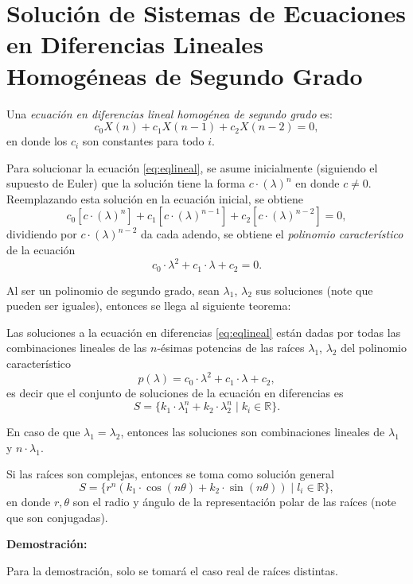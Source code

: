 \chapter{Solución de Sistemas de Ecuaciones en Diferencias Lineales Homogéneas de Segundo Grado}\label{chap:Apendice}
\begin{definition}
Una \emph{ecuación en diferencias lineal homogénea de segundo grado} es:
\begin{equation}\label{eq:eqlineal}
    c_0X(n)+c_1X(n-1)+c_2X(n-2)=0,
\end{equation}
en donde los $c_i$ son constantes para todo $i$.
\end{definition}

Para solucionar la ecuación \ref{eq:eqlineal}, se asume inicialmente (siguiendo el supuesto de Euler) que la solución tiene la forma $c\cdot (\lambda)^n$ en donde $c \neq 0$. Reemplazando esta solución en la ecuación inicial, se obtiene
$$c_0[c\cdot (\lambda)^n]+c_1[c\cdot (\lambda)^{n-1}]+c_2[c\cdot (\lambda)^{n-2}]=0,$$
dividiendo por $c\cdot(\lambda)^{n-2}$ da cada adendo, se obtiene el \emph{polinomio característico} de la ecuación
$$c_0\cdot\lambda^2 + c_1\cdot \lambda +c_2=0.$$

Al ser un polinomio de segundo grado, sean $\lambda_1$, $\lambda_2$ sus soluciones (note que pueden ser iguales), entonces se llega al siguiente teorema:

\begin{theorem}
    Las soluciones a la ecuación en diferencias \ref{eq:eqlineal} están dadas por todas las combinaciones lineales de las $n$-ésimas potencias de las raíces $\lambda_1$, $\lambda_2$ del polinomio característico
    $$p(\lambda)=c_0\cdot\lambda^2 + c_1\cdot \lambda +c_2,$$
    es decir que el conjunto de soluciones de la ecuación en diferencias es
    $$S=\{k_1\cdot \lambda_1^n+k_2\cdot \lambda_2^n\;|\;k_i\in\mathbb{R}\}.$$

    En caso de que $\lambda_1=\lambda_2$, entonces las soluciones son combinaciones lineales de $\lambda_1$ y $n\cdot \lambda_1$.

    Si las raíces son complejas, entonces se toma como solución general
    $$S=\{r^n(k_1\cdot \cos(n\theta)+k_2\cdot \sin(n\theta))\;|\;l_i\in\mathbb{R}\},$$
    en donde $r,\theta$ son el radio y ángulo de la representación polar de las raíces (note que son conjugadas).
\end{theorem}

\textbf{Demostración:}

Para la demostración, solo se tomará el caso real de raíces distintas.

